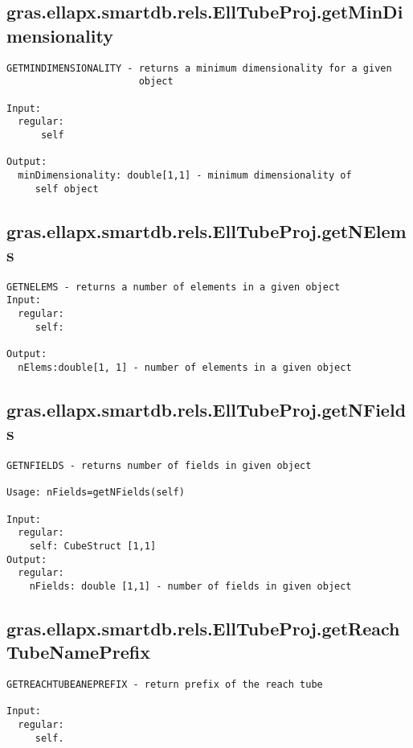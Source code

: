 \subsection{\texorpdfstring{gras.ellapx.smartdb.rels.EllTubeProj.getMinDimensionality}{getMinDimensionality}}\label{method:gras.ellapx.smartdb.rels.EllTubeProj.getMinDimensionality}
\begin{verbatim}
GETMINDIMENSIONALITY - returns a minimum dimensionality for a given
                       object

Input:
  regular:
      self

Output:
  minDimensionality: double[1,1] - minimum dimensionality of
     self object
\end{verbatim}
\subsection{\texorpdfstring{gras.ellapx.smartdb.rels.EllTubeProj.getNElems}{getNElems}}\label{method:gras.ellapx.smartdb.rels.EllTubeProj.getNElems}
\begin{verbatim}
GETNELEMS - returns a number of elements in a given object
Input:
  regular:
     self:

Output:
  nElems:double[1, 1] - number of elements in a given object
\end{verbatim}
\subsection{\texorpdfstring{gras.ellapx.smartdb.rels.EllTubeProj.getNFields}{getNFields}}\label{method:gras.ellapx.smartdb.rels.EllTubeProj.getNFields}
\begin{verbatim}
GETNFIELDS - returns number of fields in given object

Usage: nFields=getNFields(self)

Input:
  regular:
    self: CubeStruct [1,1]
Output:
  regular:
    nFields: double [1,1] - number of fields in given object
\end{verbatim}
\subsection{\texorpdfstring{gras.ellapx.smartdb.rels.EllTubeProj.getReachTubeNamePrefix}{getReachTubeNamePrefix}}\label{method:gras.ellapx.smartdb.rels.EllTubeProj.getReachTubeNamePrefix}
\begin{verbatim}
GETREACHTUBEANEPREFIX - return prefix of the reach tube

Input:
  regular:
     self.
\end{verbatim}
